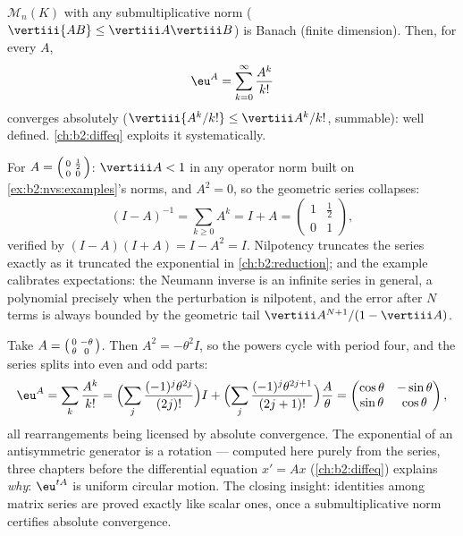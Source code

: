 \begin{example}\label{ex:b2:nvs:matrixexp}
$\mathcal{M}_n(K)$ with any submultiplicative norm ($\vertiii{AB}
\leq \vertiii A \vertiii B$) is Banach (finite dimension). Then, for
every $A$,
\[
\eu^A = \sum_{k=0}^{\infty} \frac{A^k}{k!}
\]
converges absolutely ($\vertiii{A^k/k!} \leq \vertiii A^k /k!$,
summable): well defined. \cref{ch:b2:diffeq} exploits it
systematically.
\end{example}

\begin{example}\label{ex:b2:nvs:neumannfinite}
For $A = \begin{psmallmatrix}0 & \frac12\\ 0 &
0\end{psmallmatrix}$: $\vertiii A < 1$ in any operator norm
built on \cref{ex:b2:nvs:examples}'s norms, and $A^2 = 0$, so
the geometric series collapses:
\[
(I - A)^{-1} = \sum_{k \geq 0} A^k = I + A =
\begin{pmatrix}1 & \tfrac12\\ 0 & 1\end{pmatrix},
\]
verified by $(I - A)(I + A) = I - A^2 = I$. Nilpotency
truncates the series exactly as it truncated the exponential in
\cref{ch:b2:reduction}; and the example calibrates
expectations: the Neumann inverse is an infinite series in
general, a polynomial precisely when the perturbation is
nilpotent, and the error after $N$ terms is always bounded by
the geometric tail $\vertiii A^{N+1}/(1 - \vertiii A)$.
\end{example}

\begin{example}\label{ex:b2:nvs:rotationexp}
Take $A = \begin{psmallmatrix}0 & -\theta\\ \theta &
0\end{psmallmatrix}$. Then $A^2 = -\theta^2 I$, so the powers
cycle with period four, and the series splits into even and odd
parts:
\[
\eu^{A} = \sum_{k}\frac{A^k}{k!}
= \Bigl(\sum_{j}\frac{(-1)^j\theta^{2j}}{(2j)!}\Bigr) I
+ \Bigl(\sum_{j}\frac{(-1)^j\theta^{2j+1}}{(2j+1)!}\Bigr)
\frac{A}{\theta}
= \begin{pmatrix}
\cos\theta & -\sin\theta\\
\sin\theta & \cos\theta
\end{pmatrix},
\]
all rearrangements being licensed by absolute convergence. The
exponential of an antisymmetric generator is a rotation ---
computed here purely from the series, three chapters before the
differential equation $x' = Ax$ (\cref{ch:b2:diffeq}) explains
\emph{why}: $\eu^{tA}$ is uniform circular motion. The closing
insight: identities among matrix series are proved exactly like
scalar ones, once a submultiplicative norm certifies absolute
convergence.
\end{example}

